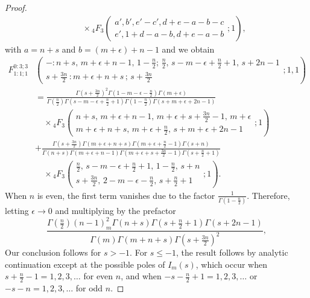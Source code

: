 \documentclass{article}
\theoremstyle{boldremark}
\renewcommand\[{\begin{equation}}
\renewcommand\]{\end{equation}}
\theoremstyle{definition}
\numberwithin{equation}{section}
\begin{document}
\begin{proof}
\begin{align}
&\quad \times {}_4F_3 \left( \begin{matrix} a', b', e'-c', d+e-a-b-c \\[3pt] e', 1+d-a-b, d+e-a-b \end{matrix} ; 1 \right),
\end{align}
with $a = n + s$ and $b = (m +\epsilon) +n-1$ and we obtain
\begin{align*}
F^{0:3;3}_{1:1;1} \! &\left(
\begin{array}{c}
  - : n+s,\, m+\epsilon+n-1,\, 1-\frac{n}{2} ; \, \frac{n}{2},\, s-m-\epsilon+\frac{n}{2}+1,\, s+2n-1 \\[3pt]
  s+\frac{3n}{2}\, : m+\epsilon+n+s \, ; \, s+\frac{3n}{2}
\end{array}
; 1, 1 \right) \\
&= \frac{\Gamma(s+\frac{3n}{2})^2 \Gamma(1-m-\epsilon-\frac{n}{2}) \Gamma(m+\epsilon)}{\Gamma(\frac{n}{2}) \Gamma(s-m-\epsilon+\frac{n}{2}+1) \Gamma(1-\frac{n}{2}) \Gamma(s+m+\epsilon+2n-1)} \\
&\quad \times {}_4F_3 \left( \begin{matrix} n+s, \, m+\epsilon+n-1, \, m+\epsilon+s+\frac{3n}{2}-1, \, m+\epsilon \\[3pt] m+\epsilon+n+s, \, m+\epsilon+\frac{n}{2}, \, s+m+\epsilon+2n-1 \end{matrix} ; 1 \right) \\
&+ \frac{\Gamma(s+\frac{3n}{2}) \Gamma(m+\epsilon+n+s) \Gamma(m+\epsilon+\frac{n}{2}-1) \Gamma(s+n)}{\Gamma(n+s) \Gamma(m+\epsilon+n-1) \Gamma(m+\epsilon+s+\frac{3n}{2}-1) \Gamma(s+\frac{n}{2}+1)} \\
&\quad \times {}_4F_3 \left( \begin{matrix} \frac{n}{2}, \, s-m-\epsilon+\frac{n}{2}+1, \, 1-\frac{n}{2}, \, s+n \\[3pt] s+\frac{3n}{2}, \, 2-m-\epsilon-\frac{n}{2}, \, s+\frac{n}{2}+1 \end{matrix} ; 1 \right).
\end{align*}
When \(n\) is even, the first term vanishes due to the factor
$\frac{1}{\Gamma(1-\frac{n}{2})}.$ Therefore, letting \(\epsilon \to 0\)
and multiplying by the prefactor
\begin{equation*}
    \frac{\Gamma(\frac{n}{2}) (n-1)_m^2 \Gamma(n+s) \Gamma(s+\frac{n}{2}+1) \Gamma(s+2n-1)}
{\Gamma(m) \Gamma(m+n+s) \Gamma(s+\frac{3n}{2})^2},
\end{equation*}
Our conclusion follows for \(s>-1\). For \(s\leq -1\), the result follows by analytic continuation except at the possible poles of \(I_m(s)\), which occur when
$
s+\frac n2-1=1,2,3,\dots
$
for even \(n\), and when
$
-s-\frac n2+1=1,2,3,\dots$ or $
-s-n=1,2,3,\dots
$
for odd \(n\).
\end{proof}
\end{document}
